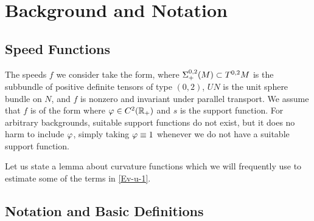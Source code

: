 \section{Background and Notation}
\label{sec:background}

\subsection{Speed Functions}
\label{subsec:bg_speed}
The speeds $f$ we consider take the form,
where $\Sigma^{0,2}_{+}(M)\subset T^{0,2}M$ is the subbundle of positive definite tensors of type $(0,2)$, $UN$ is the unit sphere bundle on $N$, and $f$ is nonzero and invariant under parallel transport. We assume that $f$ is of the form
where $\varphi\in C^2(\mathbb{R}_+)$ and $s$ is the support function. For arbitrary backgrounds, suitable support functions do not exist, but it does no harm to include $\varphi$, simply taking $\varphi \equiv 1$ whenever we do not have a suitable support function.

Let us state a lemma about curvature functions which we will frequently use to estimate some of the terms in \eqref{Ev-u-1}.

\subsection{Notation and Basic Definitions}
\label{subsec:bg_notation}

